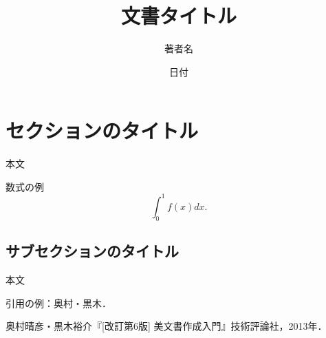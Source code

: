 \documentclass[11pt,a4j,fleqn]{jarticle}
\title{文書タイトル}
\author{著者名}
\date{日付}
\begin{document}
\maketitle

\section{セクションのタイトル}

本文

数式の例
\[
\int_0^1 f(x) dx.
\]

\subsection{サブセクションのタイトル}

本文

引用の例：奥村・黒木\cite{OkumuraKuroki13}．


\begin{thebibliography}{0}
奥村晴彦・黒木裕介『[改訂第6版] {\LaTeXe}美文書作成入門』技術評論社，2013年．
\end{thebibliography}
\end{document}
